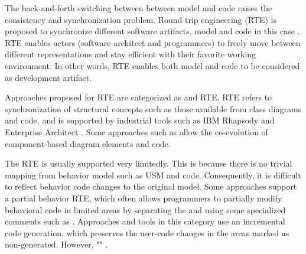 

The back-and-forth switching between between model and code raises the consistency and synchronization problem.
Round-trip engineering (RTE) \cite{Hettel2008} is proposed to synchronize different software artifacts, model and code in this case \cite{Sendall}. 
RTE enables actors (software architect and programmers) to freely move between different representations and stay efficient with their favorite working environment. 
In other words, RTE enables both model and code to be considered as development artifact. 


Approaches proposed for RTE are categorized as  and  RTE.
 RTE refers to synchronization of structural concepts such as those available from class diagrams and code, and is supported by industrial tools such as IBM Rhapsody \cite{ibm_rhapsody} and Enterprise Architect \cite{sparxsystems_enterprise_2014}.
Some approaches such as \cite{langhammer2013co, kramer2015change} allow the co-evolution of component-based diagram elements and code.

The  RTE is usually supported very limitedly. 
This is because there is no trivial mapping from behavior model such as USM and code.
Consequently, it is difficult to reflect behavior code changes to the original model.
Some approaches support a partial behavior RTE, which often allows programmers to partially modify behavioral code in limited areas by separating the  and  \cite{ibm_rhapsody,steinberg2008emf} using some specialized comments such as .
Approaches and tools in this category use an incremental code generation, which preserves the user-code changes in the areas marked as non-generated.
However, "" \cite{zheng2012enhancing}.


